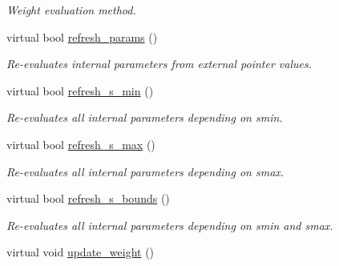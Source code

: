 \begin{DoxyCompactItemize}
\begin{DoxyCompactList}\small\item\em Weight evaluation method. \end{DoxyCompactList}\item 
virtual bool \hyperlink{a00482_af6cb5ca85a519544d1e2c2cdd86e3590}{refresh\-\_\-params} ()
\begin{DoxyCompactList}\small\item\em Re-\/evaluates internal parameters from external pointer values. \end{DoxyCompactList}\item 
virtual bool \hyperlink{a00482_a8abba1aaf5b92db4408c3d73d288e3b2}{refresh\-\_\-s\-\_\-min} ()
\begin{DoxyCompactList}\small\item\em Re-\/evaluates all internal parameters depending on smin. \end{DoxyCompactList}\item 
virtual bool \hyperlink{a00482_a2da522fd997d5c1f7da805c926b661d8}{refresh\-\_\-s\-\_\-max} ()
\begin{DoxyCompactList}\small\item\em Re-\/evaluates all internal parameters depending on smax. \end{DoxyCompactList}\item 
virtual bool \hyperlink{a00482_a1eadd2859e41a90ee631364801aeb04b}{refresh\-\_\-s\-\_\-bounds} ()
\begin{DoxyCompactList}\small\item\em Re-\/evaluates all internal parameters depending on smin and smax. \end{DoxyCompactList}\item 
\hypertarget{a00482_a4a794c408feeb519f345e702d986952b}{virtual void \hyperlink{a00482_a4a794c408feeb519f345e702d986952b}{update\-\_\-weight} ()}\label{a00482_a4a794c408feeb519f345e702d986952b}


\end{DoxyCompactItemize}
